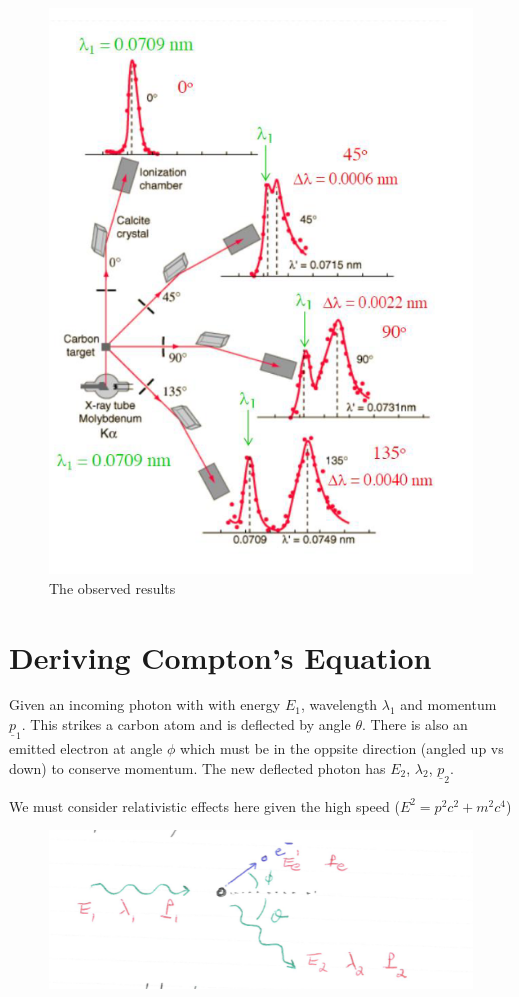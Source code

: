 \begin{figure}[H]
    \centering
    \includegraphics{figures/lec03-07.png}
     \caption{The observed results}
\end{figure}

\section*{Deriving Compton's Equation}
Given an incoming photon with with energy $E_1$, wavelength $\lambda_1$ and momentum $\underline{p}_1$. This strikes a carbon atom and is deflected by angle $\theta$. There is also an emitted electron at angle $\phi$ which must be in the oppsite direction (angled up vs down) to conserve momentum. The new deflected photon has $E_2$, $\lambda_2$, $\underline{p}_2$.

We must consider relativistic effects here given the high speed ($E^2 = p^2c^2 + m^2c^4$)

\begin{figure}[H]
    \centering
    \includegraphics{figures/lec03-08.png}
     \caption{}
\end{figure}

